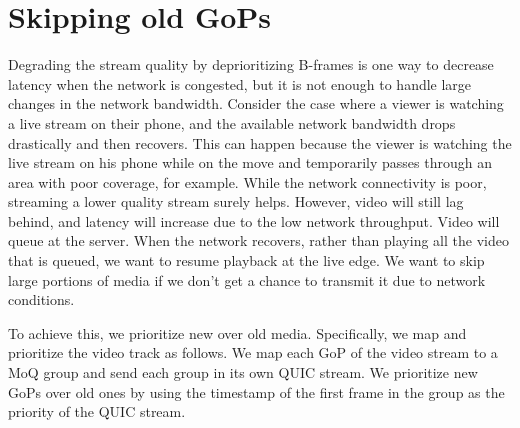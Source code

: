 \section{Skipping old GoPs}\label{chapter:skipping_old_media}
Degrading the stream quality by deprioritizing B-frames is one way to decrease latency when the network is congested, but it is not enough to handle large changes in the network bandwidth. Consider the case where a viewer is watching a live stream on their phone, and the available network bandwidth drops drastically and then recovers. This can happen because the viewer is watching the live stream on his phone while on the move and temporarily passes through an area with poor coverage, for example. While the network connectivity is poor, streaming a lower quality stream surely helps. However, video will still lag behind, and latency will increase due to the low network throughput. Video will queue at the server. When the network recovers, rather than playing all the video that is queued, we want to resume playback at the live edge. We want to skip large portions of media if we don't get a chance to transmit it due to network conditions.

To achieve this, we prioritize new over old media. Specifically, we map and prioritize the video track as follows. We map each GoP of the video stream to a MoQ group and send each group in its own QUIC stream. We prioritize new GoPs over old ones by using the timestamp of the first frame in the group as the priority of the QUIC stream.


